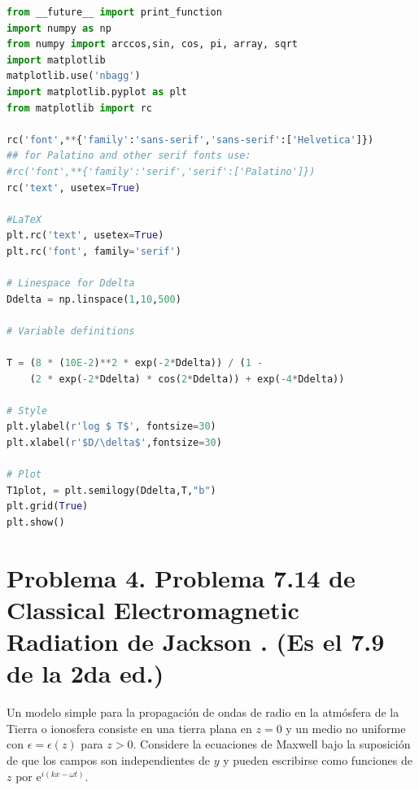 \documentclass[a4paper,11pt]{article}
\numberwithin{equation}{section}
\newcommand{\euler}{\mathrm{e}}
\begin{document}
\begin{lstlisting}[language=Python]
from __future__ import print_function
import numpy as np
from numpy import arccos,sin, cos, pi, array, sqrt
import matplotlib
matplotlib.use('nbagg')
import matplotlib.pyplot as plt
from matplotlib import rc

rc('font',**{'family':'sans-serif','sans-serif':['Helvetica']})
## for Palatino and other serif fonts use:
#rc('font',**{'family':'serif','serif':['Palatino']})
rc('text', usetex=True)

#LaTeX
plt.rc('text', usetex=True)
plt.rc('font', family='serif')

# Linespace for Ddelta
Ddelta = np.linspace(1,10,500)

# Variable definitions

T = (8 * (10E-2)**2 * exp(-2*Ddelta)) / (1 - 
    (2 * exp(-2*Ddelta) * cos(2*Ddelta)) + exp(-4*Ddelta))

# Style
plt.ylabel(r'log $ T$', fontsize=30)
plt.xlabel(r'$D/\delta$',fontsize=30)

# Plot
T1plot, = plt.semilogy(Ddelta,T,"b")
plt.grid(True)
plt.show()

\end{lstlisting}

\newpage

\section{Problema 4. Problema 7.14 de Classical Electromagnetic Radiation
de Jackson \cite{jackson}. (Es el 7.9 de la 2da ed.)}

Un modelo simple para la propagación de ondas de radio en la atmósfera de la 
Tierra o ionosfera consiste en una tierra plana en $z = 0$ y un medio no 
uniforme con $\epsilon = \epsilon(z)$ para $z > 0$. Considere la ecuaciones 
de Maxwell bajo la suposición de que los campos son independientes de $y$ y 
pueden escribirse como funciones de $z$ por $\euler^{i(kx - \omega t)}$. 
\end{document}

